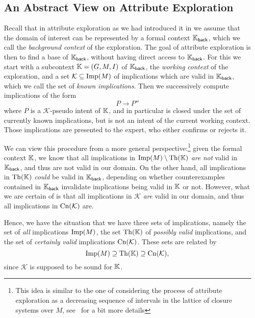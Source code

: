 \subsection{An Abstract View on Attribute Exploration}
\label{sec:class-attr-expl}

Recall that in attribute exploration as we had introduced it in  we
assume that the domain of interest can be represented by a formal context ${\mathbb{K}}_{\mathsf{back}}$, which we call the \emph{background context} of the exploration.  The
goal of attribute exploration is then to find a base of ${\mathbb{K}}_{\mathsf{back}}$, without
having direct access to ${\mathbb{K}}_{\mathsf{back}}$.  For this we start with a subcontext
${\mathbb{K}} = (G, M, I)$ of ${\mathbb{K}}_{\mathsf{back}}$, the \emph{working context} of the
exploration, and a set $\mathcal{K} \subseteq \operatorname{Imp}(M)$ of implications which are valid in
${\mathbb{K}}_{\mathsf{back}}$, which we call the set of \emph{known implications}.  Then we
successively compute implications of the form
\begin{equation*}
  P \to P''
\end{equation*}
where $P$ is a $\mathcal{K}$-pseudo intent of ${\mathbb{K}}$, and in particular is closed under
the set of currently known implications, but is not an intent of the current working
context.  Those implications are presented to the expert, who either confirms or rejects
it.

We can view this procedure from a more general perspective:\footnote{This idea is similar
  to the one of considering the process of attribute exploration as a decreasing sequence
  of intervals in the lattice of closure systems over $M$, see~\cite[pp.\
  143--145]{GORS-book} for a bit more details} given the formal context ${\mathbb{K}}$, we know
that all implications in $\operatorname{Imp}(M) \setminus \operatorname{Th}({\mathbb{K}})$ \emph{are not} valid in ${\mathbb{K}}_{\mathsf{back}}$, and thus are not valid in our domain.  On the other hand, all
implications in $\operatorname{Th}({\mathbb{K}})$ \emph{could} be valid in ${\mathbb{K}}_{\mathsf{back}}$, depending
on whether counterexamples contained in ${\mathbb{K}}_{\mathsf{back}}$ invalidate implications
being valid in ${\mathbb{K}}$ or not.  However, what we are certain of is that all implications
in $\mathcal{K}$ \emph{are} valid in our domain, and thus all implications in
$\operatorname{Cn}(\mathcal{K})$ are.

Hence, we have the situation that we have three sets of implications, namely the set of
\emph{all} implications $\operatorname{Imp}(M)$, the set $\operatorname{Th}({\mathbb{K}})$ of \emph{possibly valid}
implications, and the set of \emph{certainly valid} implications $\operatorname{Cn}(\mathcal{K})$.
These sets are related by
\begin{equation*}
  \operatorname{Imp}(M) \supseteq \operatorname{Th}({\mathbb{K}}) \supseteq \operatorname{Cn}(\mathcal{K}),
\end{equation*}
since $\mathcal{K}$ is supposed to be sound for ${\mathbb{K}}$.

